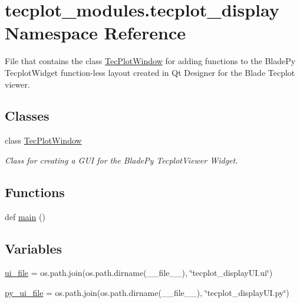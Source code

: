 \hypertarget{namespacetecplot__modules_1_1tecplot__display}{}\section{tecplot\+\_\+modules.\+tecplot\+\_\+display Namespace Reference}
\label{namespacetecplot__modules_1_1tecplot__display}


File that contains the class \hyperlink{classtecplot__modules_1_1tecplot__display_1_1_tec_plot_window}{Tec\+Plot\+Window} for adding functions to the Blade\+Py Tecplot\+Widget function-\/less layout created in Qt Designer for the Blade Tecplot viewer.  


\subsection*{Classes}
\begin{DoxyCompactItemize}
\item 
class \hyperlink{classtecplot__modules_1_1tecplot__display_1_1_tec_plot_window}{Tec\+Plot\+Window}
\begin{DoxyCompactList}\small\item\em Class for creating a G\+UI for the Blade\+Py Tecplot\+Viewer Widget. \end{DoxyCompactList}\end{DoxyCompactItemize}
\subsection*{Functions}
\begin{DoxyCompactItemize}
\item 
def \hyperlink{namespacetecplot__modules_1_1tecplot__display_ae84aaefe646aaa295bfdc9a3046a660f}{main} ()
\end{DoxyCompactItemize}
\subsection*{Variables}
\begin{DoxyCompactItemize}
\item 
\hyperlink{namespacetecplot__modules_1_1tecplot__display_a6eb7c910a295eb89ac32ad8b00d5bd2e}{ui\+\_\+file} = os.\+path.\+join(os.\+path.\+dirname(\+\_\+\+\_\+file\+\_\+\+\_\+), \char`\"{}tecplot\+\_\+display\+U\+I.\+ui\char`\"{})
\item 
\hyperlink{namespacetecplot__modules_1_1tecplot__display_a4ac8bfff686ecfec8b20653a09a9acc3}{py\+\_\+ui\+\_\+file} = os.\+path.\+join(os.\+path.\+dirname(\+\_\+\+\_\+file\+\_\+\+\_\+), \char`\"{}tecplot\+\_\+display\+U\+I.\+py\char`\"{})
\end{DoxyCompactItemize}


